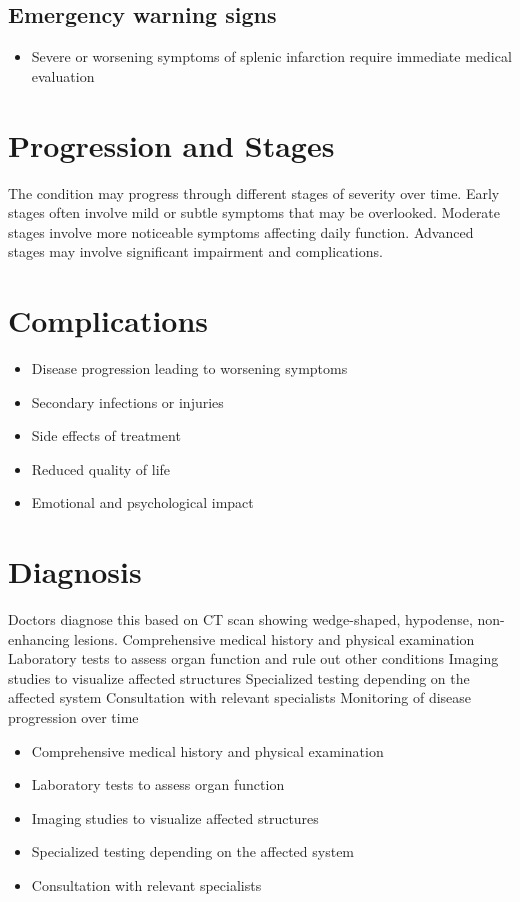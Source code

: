 \subsection{Emergency warning signs}
\begin{itemize}[noitemsep]
  \item Severe or worsening symptoms of splenic infarction require immediate medical evaluation
\end{itemize}
\section{Progression and Stages}
The condition may progress through different stages of severity over time. Early stages often involve mild or subtle symptoms that may be overlooked. Moderate stages involve more noticeable symptoms affecting daily function. Advanced stages may involve significant impairment and complications.
\section{Complications}
\begin{itemize}[noitemsep]
  \item Disease progression leading to worsening symptoms
  \item Secondary infections or injuries
  \item Side effects of treatment
  \item Reduced quality of life
  \item Emotional and psychological impact
\end{itemize}
\section{Diagnosis}
Doctors diagnose this based on CT scan showing wedge-shaped, hypodense, non-enhancing lesions. Comprehensive medical history and physical examination Laboratory tests to assess organ function and rule out other conditions Imaging studies to visualize affected structures Specialized testing depending on the affected system Consultation with relevant specialists Monitoring of disease progression over time

\begin{itemize}[noitemsep]
  \item Comprehensive medical history and physical examination
  \item Laboratory tests to assess organ function
  \item Imaging studies to visualize affected structures
  \item Specialized testing depending on the affected system
  \item Consultation with relevant specialists
\end{itemize}
